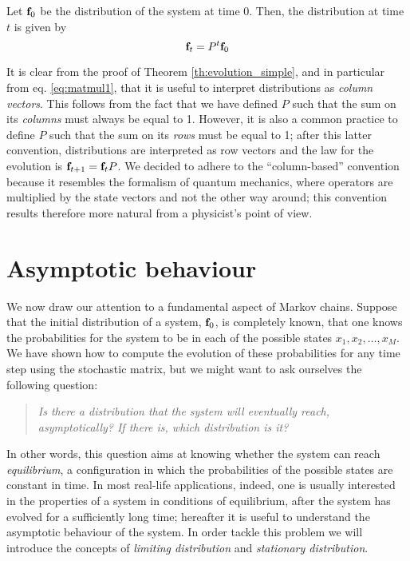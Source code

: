 \begin{corollary} \label{th:evolution_complete}
    Let $\mathbf{f}_0$ be the distribution of the system at time 0. Then, the distribution at time $t$ is given by
    \begin{equation}
        \mathbf{f}_t = P^t \mathbf{f}_0
    \end{equation}
\end{corollary}

\begin{remark}
    It is clear from the proof of Theorem \ref{th:evolution_simple}, and in particular from eq. \ref{eq:matmul1}, that it is useful to interpret distributions as \emph{column vectors}. This follows from the fact that we have defined $P$ such that the sum on its \emph{columns} must always be equal to 1. However, it is also a common practice to define $P$ such that the sum on its \emph{rows} must be equal to 1; after this latter convention, distributions are interpreted as row vectors and the law for the evolution is $\mathbf{f}_{t+1} = \mathbf{f}_t P$. We decided to adhere to the \enquote{column-based} convention because it resembles the formalism of quantum mechanics, where operators are multiplied by the state vectors and not the other way around; this convention results therefore more natural from a physicist's point of view.
\end{remark}

\section{Asymptotic behaviour}
We now draw our attention to a fundamental aspect of Markov chains. Suppose that the initial distribution of a system, $\mathbf{f}_0$, is completely known, \ie that one knows the probabilities for the system to be in each of the possible states $x_1, x_2, \dots, x_M$. We have shown how to compute the evolution of these probabilities for any time step using the stochastic matrix, but we might want to ask ourselves the following question:
\begin{quote}
    \emph{Is there a distribution that the system will eventually reach, asymptotically? If there is, which distribution is it?}
\end{quote}
In other words, this question aims at knowing whether the system can reach \emph{equilibrium}, \ie a configuration in which the probabilities of the possible states are constant in time.
In most real-life applications, indeed, one is usually interested in the properties of a system in conditions of equilibrium, after the system has evolved for a sufficiently long time; hereafter it is useful to understand the asymptotic behaviour of the system. In order tackle this problem we will introduce the concepts of \emph{limiting distribution} and \emph{stationary distribution}.

